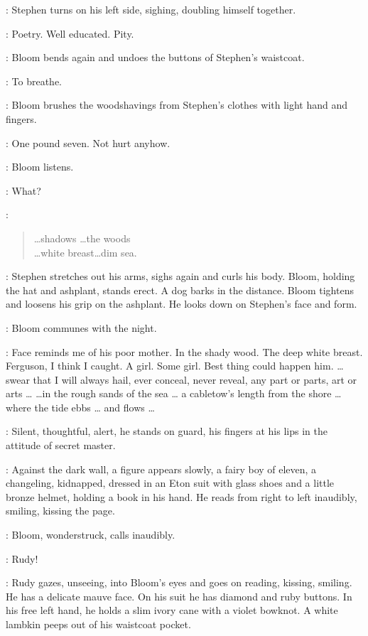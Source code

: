 :
Stephen turns on his left side, sighing, doubling himself together.

\Bloom:
Poetry.
Well educated.
Pity.

:
Bloom bends again and undoes the buttons of Stephen's waistcoat.

\Bloom:
To breathe.

:
Bloom brushes the woodshavings from Stephen's clothes with light hand and fingers.

\Bloom:
One pound seven.
Not hurt anyhow.

:
Bloom listens.

\Bloom:
What?

\Stephen:
\begin{verse}
    \ldots shadows \ldots the woods\\
    \ldots white breast\ldots dim sea.
\end{verse}

:
Stephen stretches out his arms, sighs again and curls his body.
Bloom, holding the hat and ashplant, stands erect.
A dog barks in the distance.
Bloom tightens and loosens his grip on the ashplant.
He looks down on Stephen's face and form.

:
Bloom communes with the night.

\Bloom:
Face reminds me of his poor mother.
In the shady wood.
The deep white breast.
Ferguson, I think I caught.
A girl.
Some girl.
Best thing could happen him.
\ldots swear that I will always hail, ever conceal, never reveal,
any part or parts, art or arts \ldots
{}
\ldots in the rough sands of the sea \ldots
a cabletow's length from the shore \ldots
where the tide ebbs \ldots
and flows \ldots

:
Silent, thoughtful, alert, he stands on guard,
his fingers at his lips in the attitude of secret master.

:
Against the dark wall, a figure appears slowly,
a fairy boy of eleven, a changeling, kidnapped,
dressed in an Eton suit with glass shoes and a little bronze helmet,
holding a book in his hand.
He reads from right to left inaudibly, smiling, kissing the page.%

:
Bloom, wonderstruck, calls inaudibly.

\Bloom:
Rudy!

:
Rudy gazes, unseeing, into Bloom's eyes and goes on reading, kissing, smiling.
He has a delicate mauve face.
On his suit he has diamond and ruby buttons.
In his free left hand, he holds a slim ivory cane with a violet bowknot.
A white lambkin peeps out of his waistcoat pocket.


